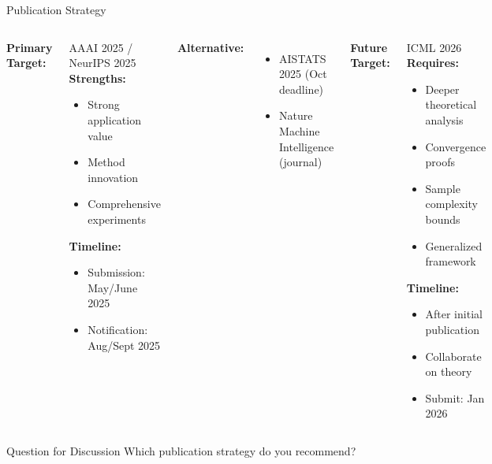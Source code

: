 \documentclass[aspectratio=169]{beamer}
\begin{document}
\begin{frame}{Publication Strategy}

\begin{columns}

\textbf{Primary Target:}

\begin{block}{AAAI 2025 / NeurIPS 2025}
\textbf{Strengths:}
\begin{itemize}
    \item Strong application value
    \item Method innovation
    \item Comprehensive experiments
\end{itemize}

\textbf{Timeline:}
\begin{itemize}
    \item Submission: May/June 2025
    \item Notification: Aug/Sept 2025
\end{itemize}
\end{block}

\vspace{0.5em}
\textbf{Alternative:}
\begin{itemize}
    \item AISTATS 2025 (Oct deadline)
    \item Nature Machine Intelligence (journal)
\end{itemize}


\textbf{Future Target:}

\begin{block}{ICML 2026}
\textbf{Requires:}
\begin{itemize}
    \item Deeper theoretical analysis
    \item Convergence proofs
    \item Sample complexity bounds
    \item Generalized framework
\end{itemize}

\textbf{Timeline:}
\begin{itemize}
    \item After initial publication
    \item Collaborate on theory
    \item Submit: Jan 2026
\end{itemize}
\end{block}

\end{columns}

\vspace{1em}
\begin{alertblock}{Question for Discussion}
Which publication strategy do you recommend?
\end{alertblock}

\end{frame}
\end{document}
